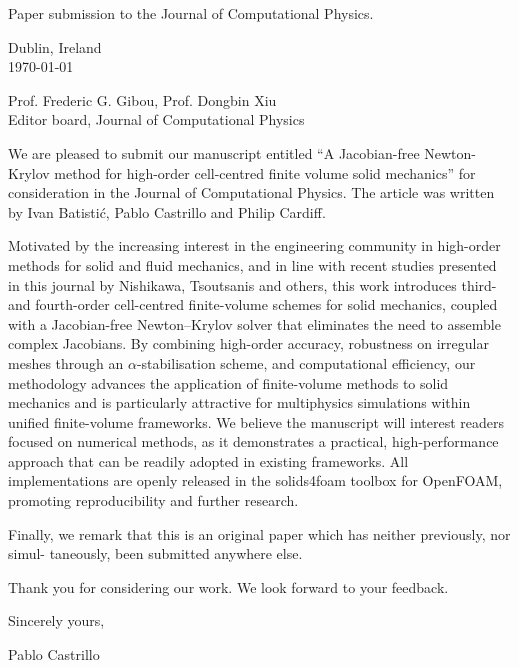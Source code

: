 \documentclass[a4paper,12pt]{article}
\begin{document}
\pagestyle{empty}


\vspace{5mm}

\begin{center}
Paper submission to the Journal of Computational Physics.
\end{center}

\vspace{5mm}

\begin{flushright}
Dublin, Ireland\\
\today
\end{flushright}


\begin{flushleft}
Prof.  Frederic G. Gibou, Prof. Dongbin Xiu\\
Editor board, Journal of Computational Physics\\
\end{flushleft}

\vspace{5mm}

We are pleased to submit our manuscript entitled ``A Jacobian-free Newton-Krylov method for high-order cell-centred finite volume solid mechanics'' for consideration in the Journal of Computational Physics.  The article was written by Ivan Batisti\'{c}, Pablo Castrillo and Philip Cardiff.

\vspace{5mm}

Motivated by the increasing interest in the engineering community in high-order methods for solid and fluid mechanics, and in line with recent studies presented in this journal by Nishikawa, Tsoutsanis and others, this work introduces third- and fourth-order cell-centred finite-volume schemes for solid mechanics, coupled with a Jacobian-free Newton–Krylov solver that eliminates the need to assemble complex Jacobians. By combining high-order accuracy, robustness on irregular meshes through an $\alpha$-stabilisation scheme, and computational efficiency, our methodology advances the application of finite-volume methods to solid mechanics and is particularly attractive for multiphysics simulations within unified finite-volume frameworks.
%
We believe the manuscript will interest readers focused on numerical methods, as it demonstrates a practical, high-performance approach that can be readily adopted in existing frameworks. All implementations are openly released in the solids4foam toolbox for OpenFOAM, promoting reproducibility and further research.



\vspace{5mm}

Finally, we remark that this is an original paper which has neither previously, nor simul-
taneously, been submitted anywhere else.

\vspace{5mm}
Thank you for considering our work. We look forward to your feedback.

\vspace{5mm}

Sincerely yours,

\vspace{2cm} 
Pablo Castrillo
\end{document}
